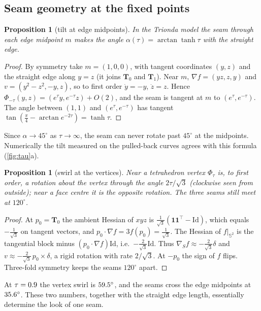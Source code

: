 \documentclass[11pt]{article}
\newtheorem{proposition}[theorem]{Proposition}
\theoremstyle{definition}
\theoremstyle{remark}
\newcommand{\Sph}{\mathbb{S}^2}
\begin{document}
\subsection{Seam geometry at the fixed points}
\begin{proposition}[tilt at edge midpoints]\label{prop:tilt}
In the Trionda model the seam through each edge midpoint $m$ makes the angle $\alpha(\tau)=\arctan\tanh\tau$ with the straight edge.
\end{proposition}
\begin{proof}
By symmetry take $m=(1,0,0)$, with tangent coordinates $(y,z)$ and the straight edge along $y=z$ (it joins $\mathbf T_0$ and $\mathbf T_1$).
Near $m$, $\nabla f=(yz,z,y)$ and $v=(y^2-z^2,-y,z)$, so to first order $\dot y=-y$, $\dot z=z$. Hence $\Phi_{-\tau}(y,z)=(e^{\tau}y,e^{-\tau}z)+O(2)$,
and the seam is tangent at $m$ to $(e^{\tau},e^{-\tau})$. The angle between $(1,1)$ and $(e^\tau,e^{-\tau})$ has tangent
$\tan(\tfrac\pi4-\arctan e^{-2\tau})=\tanh\tau$.
\end{proof}
Since $\alpha\to45^\circ$ as $\tau\to\infty$, the seam can never rotate past $45^\circ$ at the midpoints. Numerically the tilt measured on the pulled-back
curves agrees with this formula (\cref{fig:tau}a).

\begin{proposition}[swirl at the vertices]\label{prop:vertex}
Near a tetrahedron vertex $\Phi_\tau$ is, to first order, a rotation about the vertex through the angle $2\tau/\sqrt3$ (clockwise seen from outside); near a
face centre it is the opposite rotation. The three seams still meet at $120^\circ$.
\end{proposition}
\begin{proof}
At $p_0=\mathbf T_0$ the ambient Hessian of $xyz$ is $\tfrac1{\sqrt3}(\mathbf 1\mathbf 1^{\!\top}-\mathrm{Id})$, which equals $-\tfrac1{\sqrt3}$ on tangent vectors, and
$p_0\cdot\nabla f=3f(p_0)=\tfrac1{\sqrt3}$. The Hessian of $f|_{\Sph}$ is the tangential block minus $(p_0\cdot\nabla f)\mathrm{Id}$, i.e.\ $-\tfrac2{\sqrt3}\mathrm{Id}$. Thus
$\nabla_{\!S}f\approx-\tfrac2{\sqrt3}\delta$ and $v\approx-\tfrac2{\sqrt3}\,p_0\times\delta$, a rigid rotation with rate $2/\sqrt3$. At $-p_0$ the sign of $f$ flips. Three-fold symmetry
keeps the seams $120^\circ$ apart.
\end{proof}
At $\tau=0.9$ the vertex swirl is $59.5^\circ$, and the seams cross the edge midpoints at $35.6^\circ$.
These two numbers, together with the straight edge length, essentially determine the look of one seam.
\end{document}
